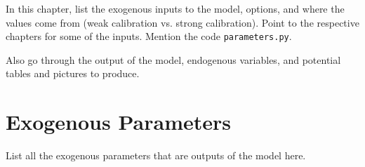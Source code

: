 
In this chapter, list the exogenous inputs to the model, options, and where the values come from (weak calibration vs. strong calibration). Point to the respective chapters for some of the inputs. Mention the code \texttt{parameters.py}.

Also go through the output of the model, endogenous variables, and potential tables and pictures to produce.


\section{Exogenous Parameters}\label{SecExEnd_Exog}

  List all the exogenous parameters that are outputs of the model here.

